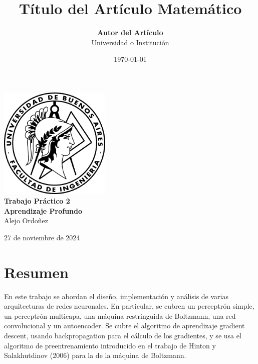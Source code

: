 \documentclass[12pt,a4paper]{article}
\title{\textbf{Título del Artículo Matemático}}
\author{\textbf{Autor del Artículo}\\ Universidad o Institución}
\date{\today}
\begin{document}
\begin{titlepage}
    \centering
    \vspace*{5cm}
    
    \includegraphics[width=0.4\textwidth]{logo-fiuba.png}\\[1cm]
    
    {\Huge \textbf{Trabajo Práctico 2}}\\[0.2cm]

    {\large \textbf{Aprendizaje Profundo}\\ Alejo Ordoñez}
    
    \vfill
    
    {\large 27 de noviembre de 2024}
\end{titlepage}

\newpage
\tableofcontents

\newpage
\section*{Resumen}
En este trabajo se abordan el diseño, implementación y análisis de varias arquitecturas de redes neuronales. En particular, se cubren un perceptrón simple, un perceptrón multicapa, una máquina restringuida de Boltzmann, una red convolucional y un autoencoder. Se cubre el algoritmo de aprendizaje gradient descent, usando backpropagation para el cálculo de los gradientes, y se usa el algoritmo de preentrenamiento introducido en el trabajo de Hinton y Salakhutdinov (2006) para la de la máquina de Boltzmann.

\newpage
\end{document}
